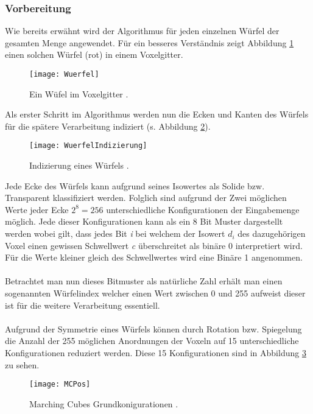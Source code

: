 \subsubsection{Vorbereitung}
Wie bereits erwähnt wird der Algorithmus für jeden einzelnen Würfel der gesamten Menge angewendet. Für ein besseres Verständnis zeigt Abbildung \ref{fig:Wuerfel} einen solchen Würfel (rot) in einem Voxelgitter.
\begin{figure}[H]
	\centering
	\texttt{[image: Wuerfel]}
	\caption{Ein Wüfel im Voxelgitter \citep{SeibtBak}.}
	\label{fig:Wuerfel}
\end{figure}
\noindent Als erster Schritt im Algorithmus werden nun die Ecken und Kanten des Würfels für die spätere Verarbeitung indiziert (s. Abbildung \ref{fig:WuerfelIndizierung}).
\begin{figure}[H]
	\centering
	\texttt{[image: WuerfelIndizierung]}
	\caption{Indizierung eines Würfels \citep{SeibtBak}.}
	\label{fig:WuerfelIndizierung}
\end{figure}

\noindent Jede Ecke des Würfels kann aufgrund seines Isowertes als Solide bzw. Transparent klassifiziert werden. Folglich sind aufgrund der Zwei möglichen Werte jeder Ecke $2^{8} = 256$ unterschiedliche Konfigurationen der Eingabemenge möglich. Jede dieser Konfigurationen kann als ein 8 Bit Muster dargestellt werden wobei gilt, dass jedes Bit \textit{i} bei welchem der Isowert \textit{$d_{i}$} des dazugehörigen Voxel einen gewissen Schwellwert \textit{c} überschreitet als binäre 0 interpretiert wird. Für die Werte kleiner gleich des Schwellwertes wird eine Binäre 1 angenommen.\\
\\ 
Betrachtet man nun dieses Bitmuster als natürliche Zahl erhält man einen sogenannten Würfelindex welcher einen Wert zwischen 0  und 255 aufweist dieser ist für die weitere Verarbeitung essentiell.\\
\\
Aufgrund der Symmetrie eines Würfels können durch Rotation bzw. Spiegelung die Anzahl der 255 möglichen Anordnungen der Voxeln auf 15 unterschiedliche Konfigurationen reduziert werden. Diese 15 Konfigurationen sind in Abbildung \ref{fig:MCPos} zu sehen.

\begin{figure}[H]
	\centering
	\texttt{[image: MCPos]}
	\caption{Marching Cubes Grundkonigurationen \citep{MCAlgo}.}
	\label{fig:MCPos}
\end{figure}

